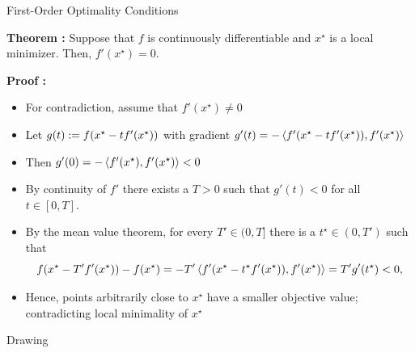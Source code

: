 \documentclass[9pt]{beamer}
\begin{document}
\begin{frame}{First-Order Optimality Conditions}

  
  \textbf{Theorem : } Suppose that $f$ is continuously differentiable and $x^\star$ is a local minimizer. Then, $f'(x^\star) = 0$.

  \vfill
  \textbf{Proof : }

  \begin{itemize}
  \item For contradiction, assume that $f'(x^\star)\neq 0$
  \item<2-> Let $g(t):= f(x^\star-t f'(x^\star))$ with gradient $g'(t) = -\left<f'(x^\star-t f'(x^\star)), f'(x^\star)\right>$
  \item<3-> Then $g'(0)=-\left<f'(x^\star), f'(x^\star)\right><0$
  \item<4-> By continuity of $f'$ there exists a $T>0$ such that $g'(t)<0$ for all $t\in [0, T]$.
  \item<5-> By the mean value theorem, for every $T'\in(0, T]$ there is a $t^\star\in (0, T')$ such that
    \[
      f(x^\star-T' f'(x^\star))-f(x^\star) = -T' \left<f'(x^\star-t^\star f'(x^\star)), f'(x^\star)\right> = T' g'(t^\star) <0,
    \]
  \item<6-> Hence, points arbitrarily close to $x^\star$ have a smaller objective value; contradicting local minimality of $x^\star$
  \end{itemize}
 
\end{frame}

\begin{frame}{Drawing}

\end{frame}
\end{document}
